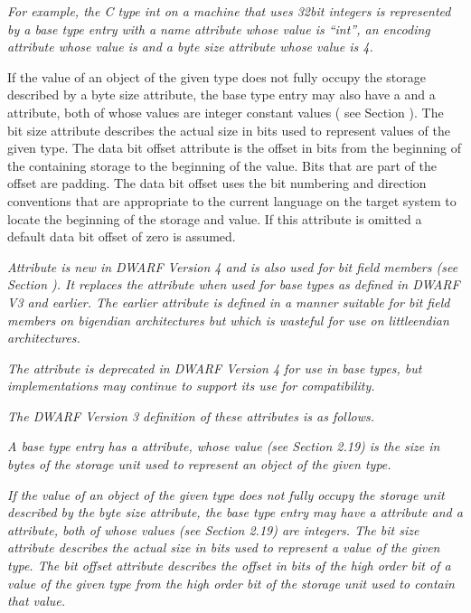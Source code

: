 \textit{For example, the C type int on a machine that uses 32\dash bit
integers is represented by a base type entry with a name
attribute whose value is “int”, an encoding attribute
whose value is  and a byte size attribute whose
value is 4.}

If the value of an object of the given type does not fully
occupy the storage described by a byte size attribute,
the base type entry may also have a  and a
 attribute, both of whose values are
integer constant values (
see Section ). 
The bit size
attribute describes the actual size in bits used to represent
values of the given type. The data bit offset attribute is the
offset in bits from the beginning of the containing storage to
the beginning of the value. Bits that are part of the offset
are padding. The data bit offset uses the bit numbering and
direction conventions that are appropriate to the current
language on the
target system to locate the beginning of the storage and
value. If this attribute is omitted a default data bit offset
of zero is assumed.

\textit{Attribute  is new in DWARF Version 4 and
is also used for bit field members 
(see Section ). 
It
replaces the attribute  when used for base
types as defined in DWARF V3 and earlier. The earlier attribute
is defined in a manner suitable for bit field members on
big\dash endian architectures but which is wasteful for use on
little\dash endian architectures.}

\textit{The attribute  is deprecated in DWARF Version
4 for use in base types, but implementations may continue to
support its use for compatibility.}

\textit{The DWARF Version 3 definition of these attributes is as follows.}

\begin{myindentpara}{1cm}
\textit{A base type entry has a  attribute, whose value
(see Section 2.19) is the size in bytes of the storage unit
used to represent an object of the given type.}

\textit{If the value of an object of the given type does not fully
occupy the storage unit described by the byte size attribute,
the base type entry may have a  attribute and a
 attribute, both of whose values (see Section
2.19) are integers. The bit size attribute describes the actual
size in bits used to represent a value of the given type.
The bit offset attribute describes the offset in bits of the
high order bit of a value of the given type from the high
order bit of the storage unit used to contain that value.}
\end{myindentpara}

